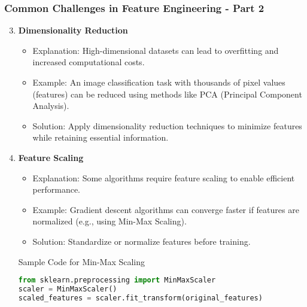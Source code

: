 \documentclass[aspectratio=169]{beamer}
\begin{document}
\begin{frame}
    \frametitle{Common Challenges in Feature Engineering - Part 2}
    \begin{enumerate}
        \setcounter{enumi}{2}
        \item \textbf{Dimensionality Reduction}
            \begin{itemize}
                \item Explanation: High-dimensional datasets can lead to overfitting and increased computational costs.
                \item Example: An image classification task with thousands of pixel values (features) can be reduced using methods like PCA (Principal Component Analysis).
                \item Solution: Apply dimensionality reduction techniques to minimize features while retaining essential information.
            \end{itemize}
        
        \item \textbf{Feature Scaling}
            \begin{itemize}
                \item Explanation: Some algorithms require feature scaling to enable efficient performance.
                \item Example: Gradient descent algorithms can converge faster if features are normalized (e.g., using Min-Max Scaling).
                \item Solution: Standardize or normalize features before training.
            \end{itemize}
            \begin{block}{Sample Code for Min-Max Scaling}
                \begin{lstlisting}[language=Python]
from sklearn.preprocessing import MinMaxScaler
scaler = MinMaxScaler()
scaled_features = scaler.fit_transform(original_features)
                \end{lstlisting}
            \end{block}
    \end{enumerate}
\end{frame}
\end{document}
